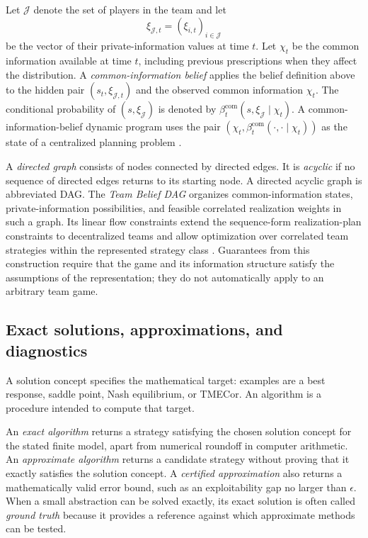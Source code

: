 Let $\mathcal{J}$ denote the set of players in the team and let
\[
    \xi_{\mathcal{J},t}=(\xi_{i,t})_{i\in\mathcal{J}}
\]
be the vector of their private-information values at time $t$. Let $\chi_t$ be the common information available at time $t$, including previous prescriptions when they affect the distribution. A \emph{common-information belief} applies the belief definition above to the hidden pair $(s_t,\xi_{\mathcal{J},t})$ and the observed common information $\chi_t$. The conditional probability of $(s,\xi_{\mathcal{J}})$ is denoted by $\beta_t^{\mathrm{com}}(s,\xi_{\mathcal{J}}\mid\chi_t)$. A common-information-belief dynamic program uses the pair $(\chi_t,\beta_t^{\mathrm{com}}(\cdot,\cdot\mid\chi_t))$ as the state of a centralized planning problem \cite{kartik2022competingteams}.

A \emph{directed graph} consists of nodes connected by directed edges. It is \emph{acyclic} if no sequence of directed edges returns to its starting node. A directed acyclic graph is abbreviated DAG. The \emph{Team Belief DAG} organizes common-information states, private-information possibilities, and feasible correlated realization weights in such a graph. Its linear flow constraints extend the sequence-form realization-plan constraints to decentralized teams and allow optimization over correlated team strategies within the represented strategy class \cite{zhang2023teambelief}. Guarantees from this construction require that the game and its information structure satisfy the assumptions of the representation; they do not automatically apply to an arbitrary team game.


\subsection{Exact solutions, approximations, and diagnostics}
\label{app:exact-approximations}

A solution concept specifies the mathematical target: examples are a best response, saddle point, Nash equilibrium, or TMECor. An algorithm is a procedure intended to compute that target.

An \emph{exact algorithm} returns a strategy satisfying the chosen solution concept for the stated finite model, apart from numerical roundoff in computer arithmetic. An \emph{approximate algorithm} returns a candidate strategy without proving that it exactly satisfies the solution concept. A \emph{certified approximation} also returns a mathematically valid error bound, such as an exploitability gap no larger than $\epsilon$. When a small abstraction can be solved exactly, its exact solution is often called \emph{ground truth} because it provides a reference against which approximate methods can be tested.

